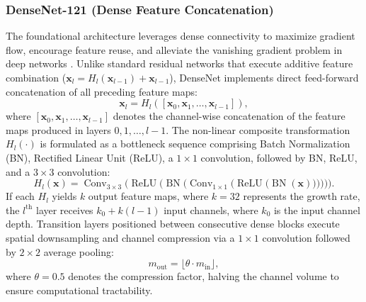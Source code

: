 \documentclass[journal]{IEEEtran}
\begin{document}
\subsubsection{DenseNet-121 (Dense Feature Concatenation)}
The foundational architecture leverages dense connectivity to maximize gradient flow, encourage feature reuse, and alleviate the vanishing gradient problem in deep networks \cite{huang2017densely}. Unlike standard residual networks that execute additive feature combination ($\mathbf{x}_l = H_l(\mathbf{x}_{l-1}) + \mathbf{x}_{l-1}$), DenseNet implements direct feed-forward concatenation of all preceding feature maps:
\begin{equation}
\mathbf{x}_l = H_l\left(\left[\mathbf{x}_0, \mathbf{x}_1, \dots, \mathbf{x}_{l-1}\right]\right),
\label{eq:densenet_concat}
\end{equation}
where $[\mathbf{x}_0, \mathbf{x}_1, \dots, \mathbf{x}_{l-1}]$ denotes the channel-wise concatenation of the feature maps produced in layers $0, 1, \dots, l-1$. The non-linear composite transformation $H_l(\cdot)$ is formulated as a bottleneck sequence comprising Batch Normalization (BN), Rectified Linear Unit (ReLU), a $1\times1$ convolution, followed by BN, ReLU, and a $3\times3$ convolution:
\begin{equation}
H_l(\mathbf{x}) = \operatorname{Conv}_{3\times3}\Big(\operatorname{ReLU}\big(\operatorname{BN}\big(\operatorname{Conv}_{1\times1}\big(\operatorname{ReLU}\big(\operatorname{BN}(\mathbf{x})\big)\big)\big)\big)\Big).
\label{eq:densenet_bottleneck}
\end{equation}
If each $H_l$ yields $k$ output feature maps, where $k=32$ represents the growth rate, the $l^{\text{th}}$ layer receives $k_0 + k(l-1)$ input channels, where $k_0$ is the input channel depth. Transition layers positioned between consecutive dense blocks execute spatial downsampling and channel compression via a $1\times1$ convolution followed by $2\times2$ average pooling:
\begin{equation}
m_{\text{out}} = \lfloor \theta \cdot m_{\text{in}} \rfloor,
\label{eq:densenet_compression}
\end{equation}
where $\theta = 0.5$ denotes the compression factor, halving the channel volume to ensure computational tractability.
\end{document}
